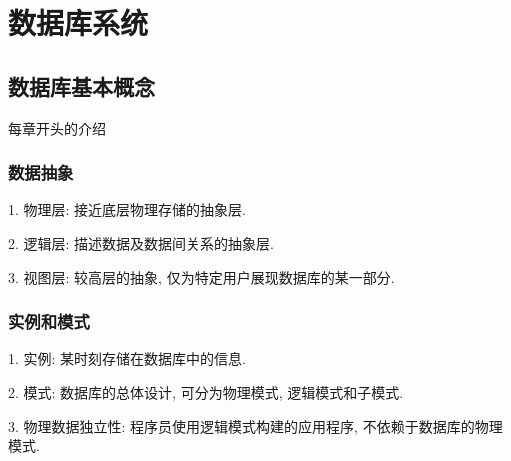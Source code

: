 \chapter{数据库系统}
\thispagestyle{empty}

\setlength{\fboxrule}{0pt}\setlength{\fboxsep}{0cm}
\noindent{}
\setlength{\fboxrule}{1pt}\setlength{\fboxsep}{4pt}


\newpage

\section{数据库基本概念}

\begin{tcolorbox}[colback=red!5,colframe=red!75!black]
    每章开头的介绍
\end{tcolorbox}

\subsection{数据抽象}

1. 物理层: 接近底层物理存储的抽象层.

2. 逻辑层: 描述数据及数据间关系的抽象层.

3. 视图层: 较高层的抽象, 仅为特定用户展现数据库的某一部分.

\subsection{实例和模式}

1. 实例: 某时刻存储在数据库中的信息.

2. 模式: 数据库的总体设计, 可分为物理模式, 逻辑模式和子模式.

3. 物理数据独立性: 程序员使用逻辑模式构建的应用程序, 不依赖于数据库的物理模式.


